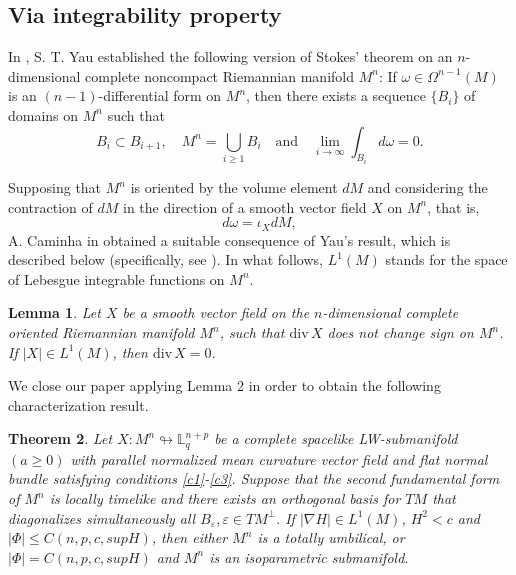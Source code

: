 \documentclass[leqno,11pt]{amsart}
\theoremstyle{plain}
\newtheorem{theorem}{\indent\sc Theorem}[section]
\newtheorem{lemma}[theorem]{\indent\sc Lemma}
\theoremstyle{definition}
\numberwithin{equation}{section}
\begin{document}
\subsection{Via integrability property}

In \cite{yau_new}, S. T. Yau established the following version of Stokes' theorem on an $n$-dimensional complete noncompact Riemannian manifold $M^n$: If $\omega \in \Omega^{n-1}(M)$ is an $(n-1)$-differential form on $M^n$, then there exists a sequence $\{B_i\}$ of domains on $M^n$ such that
$$
B_i \subset B_{i+1}, \quad M^n = \bigcup_{i \geq 1} B_i \quad \text{and} \quad \lim_{i \to \infty} \int_{B_i} d\omega = 0.
$$

Supposing that $M^n$ is oriented by the volume element $dM$ and considering the contraction of $dM$ in the direction of a smooth vector field $X$ on $M^n$, that is,
$$
d\omega = \iota_X dM,
$$
A. Caminha in \cite{caminha:11} obtained a suitable consequence of Yau's result, which is described below (specifically, see \cite[Proposition 2.1]{caminha:11}). In what follows, $L^1(M)$ stands for the space of Lebesgue integrable functions on $M^n$.

\begin{lemma}\label{lemmaL1}
Let $X$ be a smooth vector field on the $n$-dimensional complete oriented Riemannian manifold $M^n$, such that $\mathrm{div}\, X$ does not change sign on $M^n$. If $|X| \in L^1(M)$, then $\mathrm{div}\, X = 0$.
\end{lemma}

We close our paper applying Lemma 2 in order to obtain the following characterization result.

\begin{theorem}
Let $X:M^n\looparrowright \mathbb{L}^{n+p}_{q}$ be a complete spacelike LW-submanifold $(a\geq0)$ with parallel normalized mean curvature vector field and flat normal bundle satisfying conditions \eqref{c1}-\eqref{c3}. Suppose that the second fundamental form of $M^n$ is locally timelike and there exists an orthogonal basis for $TM$ that diagonalizes simultaneously all $B_{\varepsilon},
\varepsilon\in TM^{\perp}.$ If $|\nabla H| \in L^1(M)$, $H^2<c$ and %
$|\Phi|\leq C(n,p,c,supH)$, then either $M^n$ is a totally umbilical, or $|\Phi| =  C(n,p,c,supH)$ and $M^n$ is an isoparametric submanifold.
\end{theorem}
\end{document}

